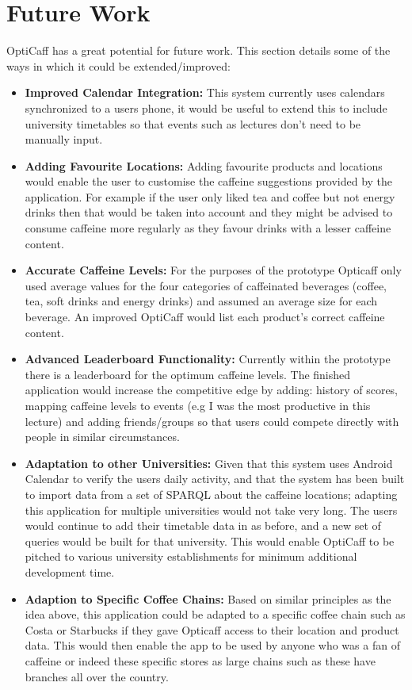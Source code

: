 \section{Future Work}

OptiCaff has a great potential for future work. This section details some of the ways in which it could be extended/improved:

\begin{itemize}
	\item{\textbf{Improved Calendar Integration:}
		This system currently uses calendars synchronized to a users phone, it would be useful to extend this to include  		    university timetables so that events such as lectures don't need to be manually input.
	}
	\item{\textbf{Adding Favourite Locations:}
		Adding favourite products and locations would enable the user to customise the caffeine 
		suggestions provided by the application. For example if the user only liked tea and coffee but not energy
		drinks then that would be taken into account and they might be advised to consume
		caffeine more regularly as they favour drinks with a lesser caffeine content. 
	}
	\item{\textbf{Accurate Caffeine Levels:}
		For the purposes of the prototype Opticaff only used average values for the four categories of caffeinated
		beverages (coffee, tea, soft drinks and energy drinks) and assumed an average size for each beverage. An
		improved OptiCaff would list each product's correct caffeine content.
	}
	\item{\textbf{Advanced Leaderboard Functionality:}
	Currently within the prototype there is a leaderboard for the optimum caffeine levels. The finished application
	would increase the competitive edge by adding: history of scores, mapping caffeine levels to events (e.g I was the
	most productive in this lecture) and adding friends/groups so that users could compete directly with people in
	similar circumstances.
	}
	\item{\textbf{Adaptation to other Universities:}
	Given that this system uses Android Calendar to verify the users daily activity, and that the system has been
	built to import data from a set of SPARQL about the caffeine locations; adapting this application for multiple
	universities would not take very long. The users would continue to add their timetable data in as before, and a
	new set of queries would be built for that university. This would enable OptiCaff to be pitched to various
	university establishments for minimum additional development time.  
	}
	\item{\textbf{Adaption to Specific Coffee Chains:}
	Based on similar principles as the idea above, this application could be adapted to a specific coffee chain such
	as Costa or Starbucks if they gave Opticaff access to their location and product data. This would then enable the 
	app to be used by anyone who was a fan of caffeine or indeed these specific stores as large chains such as these 
	have branches all over the country.
	}
\end{itemize}